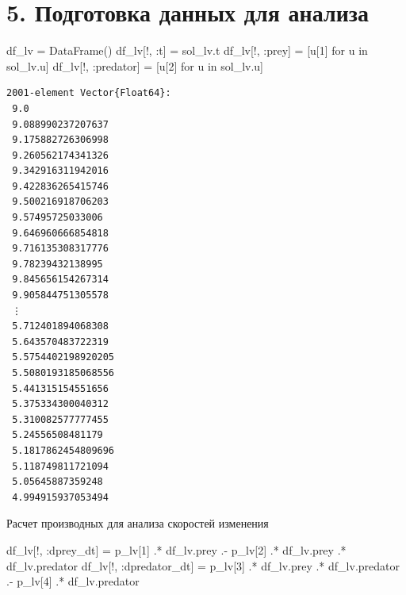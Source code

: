 \documentclass[
  12pt,
  a4paper,
  DIV=11,
  numbers=noendperiod]{scrreprt}
\newenvironment{Shaded}{\begin{snugshade}}{\end{snugshade}}
\newcommand{\FloatTok}[1]{\textcolor[rgb]{0.68,0.00,0.00}{#1}}
\newcommand{\FunctionTok}[1]{\textcolor[rgb]{0.28,0.35,0.67}{#1}}
\newcommand{\KeywordTok}[1]{\textcolor[rgb]{0.00,0.23,0.31}{#1}}
\newcommand{\NormalTok}[1]{\textcolor[rgb]{0.00,0.23,0.31}{#1}}
\newcommand{\OperatorTok}[1]{\textcolor[rgb]{0.37,0.37,0.37}{#1}}
\begin{document}
\section{5. Подготовка данных для
анализа}\label{ux43fux43eux434ux433ux43eux442ux43eux432ux43aux430-ux434ux430ux43dux43dux44bux445-ux434ux43bux44f-ux430ux43dux430ux43bux438ux437ux430}

\begin{Shaded}
\begin{Highlighting}[]
\NormalTok{df\_lv }\OperatorTok{=} \FunctionTok{DataFrame}\NormalTok{()}
\NormalTok{df\_lv[!, }\OperatorTok{:}\NormalTok{t] }\OperatorTok{=}\NormalTok{ sol\_lv.t}
\NormalTok{df\_lv[!, }\OperatorTok{:}\NormalTok{prey] }\OperatorTok{=}\NormalTok{ [u[}\FloatTok{1}\NormalTok{] for u }\KeywordTok{in}\NormalTok{ sol\_lv.u]}
\NormalTok{df\_lv[!, }\OperatorTok{:}\NormalTok{predator] }\OperatorTok{=}\NormalTok{ [u[}\FloatTok{2}\NormalTok{] for u }\KeywordTok{in}\NormalTok{ sol\_lv.u]}
\end{Highlighting}
\end{Shaded}

\begin{verbatim}
2001-element Vector{Float64}:
 9.0
 9.088990237207637
 9.175882726306998
 9.260562174341326
 9.342916311942016
 9.422836265415746
 9.500216918706203
 9.57495725033006
 9.646960666854818
 9.716135308317776
 9.78239432138995
 9.845656154267314
 9.905844751305578
 ⋮
 5.712401894068308
 5.643570483722319
 5.5754402198920205
 5.5080193185068556
 5.441315154551656
 5.375334300040312
 5.310082577777455
 5.24556508481179
 5.1817862454809696
 5.118749811721094
 5.05645887359248
 4.994915937053494
\end{verbatim}

Расчет производных для анализа скоростей изменения

\begin{Shaded}
\begin{Highlighting}[]
\NormalTok{df\_lv[!, }\OperatorTok{:}\NormalTok{dprey\_dt] }\OperatorTok{=}\NormalTok{ p\_lv[}\FloatTok{1}\NormalTok{] }\OperatorTok{.*}\NormalTok{ df\_lv.prey }\OperatorTok{.{-}}\NormalTok{ p\_lv[}\FloatTok{2}\NormalTok{] }\OperatorTok{.*}\NormalTok{ df\_lv.prey }\OperatorTok{.*}\NormalTok{ df\_lv.predator}
\NormalTok{df\_lv[!, }\OperatorTok{:}\NormalTok{dpredator\_dt] }\OperatorTok{=}\NormalTok{ p\_lv[}\FloatTok{3}\NormalTok{] }\OperatorTok{.*}\NormalTok{ df\_lv.prey }\OperatorTok{.*}\NormalTok{ df\_lv.predator }\OperatorTok{.{-}}\NormalTok{ p\_lv[}\FloatTok{4}\NormalTok{] }\OperatorTok{.*}\NormalTok{ df\_lv.predator}
\end{Highlighting}
\end{Shaded}
\end{document}
